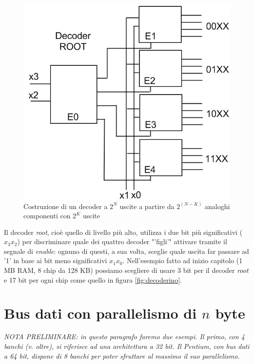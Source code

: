 \begin{figure}[!h]
\centering
\includegraphics[width=0.55\columnwidth]{img/decoderone}
\caption{Costruzione di un decoder a $2^N$ uscite a partire da $2^{(N-K)}$ analoghi componenti con $2^K$ uscite}
\label{fig:decoderone}
\end{figure}

Il decoder \textit{root}, cioè quello di livello più alto, utilizza i due bit più significativi ($x_3x_2$) per discriminare quale dei quattro decoder "'figli'" attivare tramite il segnale di \textit{enable}: ognuno di questi, a sua volta, sceglie quale uscita far passare ad '1' in base ai bit meno significativi $ x_1x_0$.
Nell'esempio fatto ad inizio capitolo (1 MB RAM, 8 chip da 128 KB) possiamo scegliere di usare 3 bit per il decoder \textit{root} e 17 bit per ogni chip come quello in figura \ref{fig:decoderino}.

\section{Bus dati con parallelismo di $n$ byte}
\label{sec:multipliByte}

\textsf{
\textit{NOTA PRELIMINARE: in questo paragrafo faremo due esempi. Il primo, con 4 banchi (v. oltre), si riferisce ad una  architettura a 32 bit. Il Pentium, con bus dati a 64 bit, dispone di 8 banchi per poter sfruttare al massimo il suo parallelismo.}} \\


